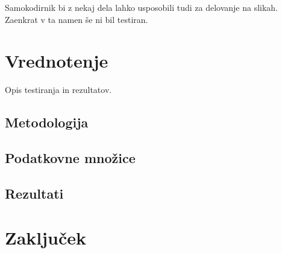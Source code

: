 \documentclass[12pt,a4paper]{article}
\begin{document}
Samokodirnik bi z nekaj dela lahko usposobili tudi za delovanje na slikah.
Zaenkrat v ta namen še ni bil testiran.


\section{Vrednotenje}
Opis testiranja in rezultatov.

\subsection{Metodologija}


\subsection{Podatkovne množice}


\subsection{Rezultati}


\section{Zaključek}  
\end{document}
